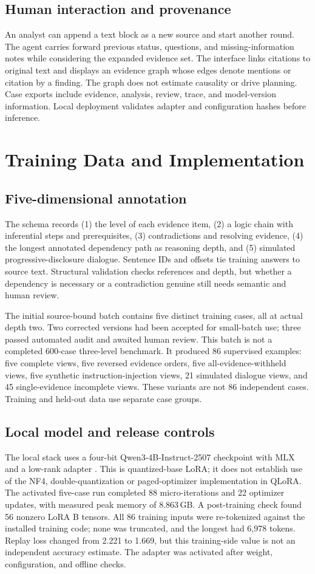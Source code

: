 \documentclass[10pt,a4paper]{article}
\begin{document}
\subsection{Human interaction and provenance}
An analyst can append a text block as a new source and start another round. The agent carries forward previous status, questions, and missing-information notes while considering the expanded evidence set. The interface links citations to original text and displays an evidence graph whose edges denote mentions or citation by a finding. The graph does not estimate causality or drive planning. Case exports include evidence, analysis, review, trace, and model-version information. Local deployment validates adapter and configuration hashes before inference.

\section{Training Data and Implementation}
\subsection{Five-dimensional annotation}
The schema records (1) the level of each evidence item, (2) a logic chain with inferential steps and prerequisites, (3) contradictions and resolving evidence, (4) the longest annotated dependency path as reasoning depth, and (5) simulated progressive-disclosure dialogue. Sentence IDs and offsets tie training answers to source text. Structural validation checks references and depth, but whether a dependency is necessary or a contradiction genuine still needs semantic and human review.

The initial source-bound batch contains five distinct training cases, all at actual depth two. Two corrected versions had been accepted for small-batch use; three passed automated audit and awaited human review. This batch is not a completed 600-case three-level benchmark. It produced 86 supervised examples: five complete views, five reversed evidence orders, five all-evidence-withheld views, five synthetic instruction-injection views, 21 simulated dialogue views, and 45 single-evidence incomplete views. These variants are not 86 independent cases. Training and held-out data use separate case groups.

\subsection{Local model and release controls}
The local stack uses a four-bit Qwen3-4B-Instruct-2507 checkpoint with MLX and a low-rank adapter \cite{qwen3,lora,qlora}. This is quantized-base LoRA; it does not establish use of the NF4, double-quantization or paged-optimizer implementation in QLoRA. The activated five-case run completed 88 micro-iterations and 22 optimizer updates, with measured peak memory of 8.863\,GB. A post-training check found 56 nonzero LoRA B tensors. All 86 training inputs were re-tokenized against the installed training code; none was truncated, and the longest had 6,978 tokens. Replay loss changed from 2.221 to 1.669, but this training-side value is not an independent accuracy estimate. The adapter was activated after weight, configuration, and offline checks.
\end{document}
